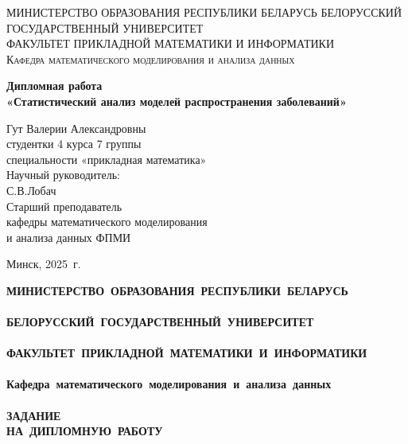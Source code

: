\documentclass[a4paper, 14pt]{extreport}
\begin{document}
	\def\contentsname{ОГЛАВЛЕНИЕ}
	
	\begin{titlepage}
		\begin{center}
			\textsc{МИНИСТЕРСТВО ОБРАЗОВАНИЯ РЕСПУБЛИКИ БЕЛАРУСЬ БЕЛОРУССКИЙ ГОСУДАРСТВЕННЫЙ УНИВЕРСИТЕТ
				\\[5mm]
				ФАКУЛЬТЕТ ПРИКЛАДНОЙ МАТЕМАТИКИ И ИНФОРМАТИКИ\\[2mm]
				Кафедра математического моделирования и анализа данных
			}
			
			\vfill
			
			\textbf{Дипломная работа
				\\[3mm]
				«Статистический анализ моделей распространения заболеваний»
				\\[26mm]
			}
		\end{center}
		
		\hfill
		\begin{minipage}{.5\textwidth}
			\begin{flushright}
				Гут Валерии Александровны\\
				студентки 4 курса 7 группы\\
				специальности «прикладная математика»\\[5mm]
				
				Научный руководитель:\\[2mm] 
				С.В.Лобач\\
				Старший преподаватель\\
				кафедры математического моделирования\\
				и анализа данных ФПМИ
				
			\end{flushright}
		\end{minipage}%
		\vfill
		\begin{center}
			Минск, 2025\ г.
		\end{center}
	\end{titlepage}
	\newpage
	\setcounter{page}{2}
	\begin{center}
		\bf
		{
			\small\mbox{МИНИСТЕРСТВО~ОБРАЗОВАНИЯ~РЕСПУБЛИКИ~БЕЛАРУСЬ} \\~\\
			\mbox{БЕЛОРУССКИЙ~ГОСУДАРСТВЕННЫЙ~УНИВЕРСИТЕТ} \\~\\
			\mbox{ФАКУЛЬТЕТ~ПРИКЛАДНОЙ МАТЕМАТИКИ~И~ИНФОРМАТИКИ} \\~\\
			\mbox{Кафедра~математического~моделирования~и~анализа~данных} \\~\\[2mm]
		}
		\bf
		{
			\mbox{\small ЗАДАНИЕ}\\
			\mbox{\small НА ДИПЛОМНУЮ РАБОТУ} \\[6mm]
		}
	\end{center}
\end{document}
